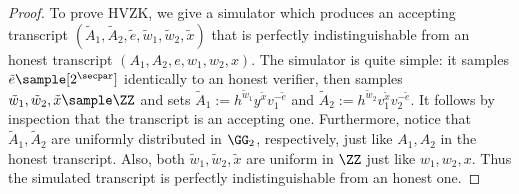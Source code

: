 \begin{proof}
    
    To prove HVZK, we give a simulator which produces an accepting transcript $(\tilde{A}_1, \tilde{A}_2, \tilde{e}, \tilde{w}_1, \tilde{w}_2, \tilde{x})$ that is perfectly indistinguishable from an honest transcript $(A_1, A_2, e, w_1, w_2, x)$. The simulator is quite simple: it samples $\tilde{e} \sample [2^\secpar]$ identically to an honest verifier, then samples $\tilde{w}_1, \tilde{w}_2, \tilde{x} \sample \ZZ$ and sets $\tilde{A}_1 := h^{\tilde{w}_1} y^{\tilde{x}} v_1^{-\tilde{e}}$ and $\tilde{A}_2 := h^{\tilde{w}_2} v_1^{\tilde{x}} v_2^{-\tilde{e}}$. It follows by inspection that the transcript is an accepting one. Furthermore, notice that $\tilde{A}_1, \tilde{A}_2$ are uniformly distributed in $\GG_2$, respectively, just like $A_1, A_2$ in the honest transcript. Also, both $\tilde{w}_1,\tilde{w}_2,\tilde{x}$ are uniform in $\ZZ$ just like $w_1, w_2, x$. Thus the simulated transcript is perfectly indistinguishable from an honest one.
\end{proof}

